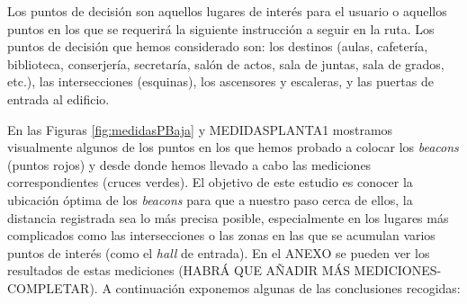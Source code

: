 Los puntos de decisión son aquellos lugares de interés para el usuario o aquellos puntos en los que se requerirá la siguiente instrucción a seguir en la ruta. Los puntos de decisión que hemos considerado son: los destinos (aulas, cafetería, biblioteca, conserjería, secretaría, salón de actos, sala de juntas, sala de grados, etc.), las intersecciones (esquinas), los ascensores y escaleras, y las puertas de entrada al edificio.

En las Figuras \ref{fig:medidasPBaja} y MEDIDASPLANTA1 mostramos visualmente algunos de los puntos en los que hemos probado a colocar los \textit{beacons} (puntos rojos) y desde donde hemos llevado a cabo las mediciones correspondientes (cruces verdes). El objetivo de este estudio es conocer la ubicación óptima de los \textit{beacons} para que a nuestro paso cerca de ellos, la distancia registrada sea lo más precisa posible, especialmente en los lugares más complicados como las intersecciones o las zonas en las que se acumulan varios puntos de interés (como el \textit{hall} de entrada). En el ANEXO se pueden ver los resultados de estas mediciones (HABRÁ QUE AÑADIR MÁS MEDICIONES-COMPLETAR). A continuación exponemos algunas de las conclusiones recogidas:


